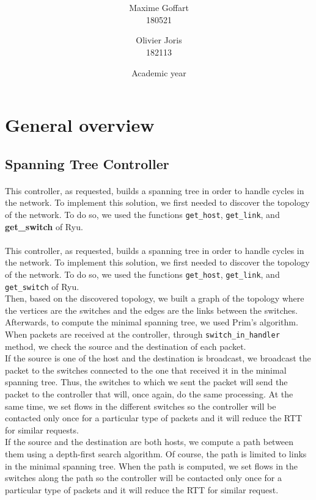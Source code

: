 \documentclass[a4paper, 11pt, oneside]{article}
\title{\ClassName\\\vspace*{0.8cm}\ProjectName\vspace{1cm}}
\author{Maxime Goffart \\180521 \and Olivier Joris\\182113}
\date{\vspace{1cm}Academic year \AcademicYear}
\begin{document}
\begin{titlingpage}
{\let\newpage\relax\maketitle}
\end{titlingpage}

\thispagestyle{empty}
\newpage


\section{General overview}

\subsection{Spanning Tree Controller}
\paragraph{}This controller, as requested, builds a spanning tree in order to handle cycles in the network. To implement this solution, we first needed to discover the topology of the network. To do so, we used the functions \texttt{get\_host}, \texttt{get\_link}, and \textbf{get\_switch} of Ryu.\\
\paragraph{}This controller, as requested, builds a spanning tree in order to handle cycles in the network. To implement this solution, we first needed to discover the topology of the network. To do so, we used the functions \texttt{get\_host}, \texttt{get\_link}, and \texttt{get\_switch} of Ryu.\\
Then, based on the discovered topology, we built a graph of the topology where the vertices are the switches and the edges are the links between the switches. Afterwards, to compute the minimal spanning tree, we used Prim's algorithm.\\
\indent When packets are received at the controller, through \texttt{switch\_in\_handler} method, we check the source and the destination of each packet.\\
If the source is one of the host and the destination is broadcast, we broadcast the packet to the switches connected to the one that received it in the minimal spanning tree. Thus, the switches to which we sent the packet will send the packet to the controller that will, once again, do the same processing. At the same time, we set flows in the different switches so the controller will be contacted only once for a particular type of packets and it will reduce the RTT for similar requests.\\
If the source and the destination are both hosts, we compute a path between them using a depth-first search algorithm. Of course, the path is limited to links in the minimal spanning tree. When the path is computed, we set flows in the switches along the path so the controller will be contacted only once for a particular type of packets and it will reduce the RTT for similar request.
\end{document}
